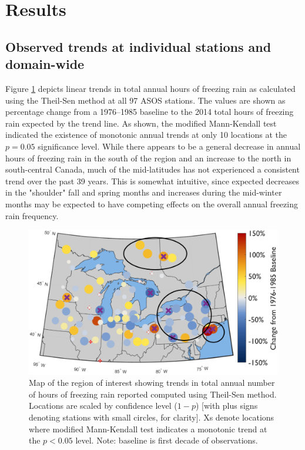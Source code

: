 \documentclass[twocol]{ametsoc}
\begin{document}
\section{Results}



\subsection{Observed trends at individual stations and domain-wide}






Figure \ref{fig:trendmap} depicts linear trends in total annual hours of freezing rain as calculated using the Theil-Sen method at all 97 ASOS stations. The values are shown as percentage change from a 1976--1985 baseline to the 2014 total hours of freezing rain expected by the trend line. As shown, the modified Mann-Kendall test indicated the existence of monotonic annual trends at only 10 locations at the $p=0.05$ significance level. While there appears to be a general decrease in annual hours of freezing rain in the south of the region and an increase to the north in south-central Canada, much of the mid-latitudes has not experienced a consistent trend over the past 39 years. This is somewhat intuitive, since expected decreases in the "shoulder" fall and spring months and increases during the mid-winter months may be expected to have competing effects on the overall annual freezing rain frequency.



\begin{figure}

\centering

\includegraphics[width=1.0\textwidth]{trendmap.png}

\caption{\label{fig:trendmap}Map of the region of interest showing trends in total annual number of hours of freezing rain reported computed using Theil-Sen method. Locations are scaled by confidence level ($1 - p$) [with plus signs denoting stations with small circles, for clarity]. Xs denote locations where modified Mann-Kendall test indicates a monotonic trend at the $p<0.05$ level. Note: baseline is first decade of observations.}

\end{figure}
\end{document}
